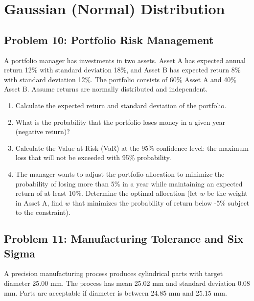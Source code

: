 \documentclass[12pt]{article}
\begin{document}

\section{Gaussian (Normal) Distribution}

\subsection*{Problem 10: Portfolio Risk Management}

A portfolio manager has investments in two assets. Asset A has expected annual return 12\% with standard deviation 18\%, and Asset B has expected return 8\% with standard deviation 12\%. The portfolio consists of 60\% Asset A and 40\% Asset B. Assume returns are normally distributed and independent.

\begin{enumerate}[label=(\alph*)]
\item Calculate the expected return and standard deviation of the portfolio.

\item What is the probability that the portfolio loses money in a given year (negative return)?

\item Calculate the Value at Risk (VaR) at the 95\% confidence level: the maximum loss that will not be exceeded with 95\% probability.

\item The manager wants to adjust the portfolio allocation to minimize the probability of losing more than 5\% in a year while maintaining an expected return of at least 10\%. Determine the optimal allocation (let \(w\) be the weight in Asset A, find \(w\) that minimizes the probability of return below -5\% subject to the constraint).
\end{enumerate}

\subsection*{Problem 11: Manufacturing Tolerance and Six Sigma}

A precision manufacturing process produces cylindrical parts with target diameter 25.00 mm. The process has mean 25.02 mm and standard deviation 0.08 mm. Parts are acceptable if diameter is between 24.85 mm and 25.15 mm.
\end{document}
